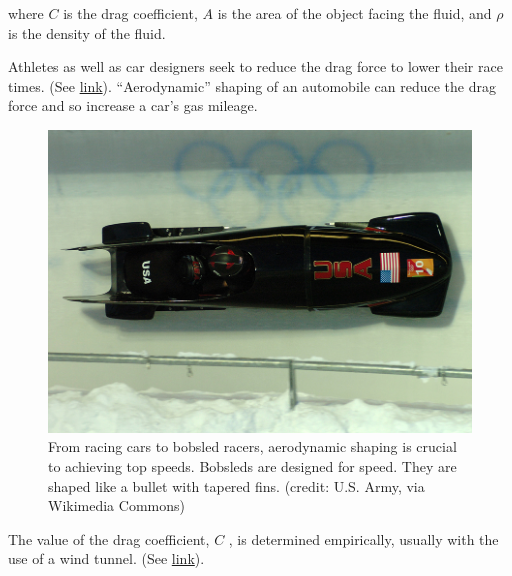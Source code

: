\documentclass[
]{book}
\begin{document}
where \(C{}\) is the drag coefficient, \(A{}\) is the area of the object
facing the fluid, and \(\rho{}\) is the density of the fluid.

Athletes as well as car designers seek to reduce the drag force to lower
their race times. (See
\protect\hyperlink{import-auto-id1165298931800}{link}).
``Aerodynamic'' shaping of an automobile can reduce the drag force and so
increase a car's gas mileage.

\begin{figure}
\hypertarget{import-auto-id1165298931800}{%
\centering
\includegraphics{images/Figure_06_02_02a.jpg}
\caption{From racing cars to bobsled racers, aerodynamic shaping is crucial to
achieving top speeds. Bobsleds are designed for speed. They are shaped
like a bullet with tapered fins. (credit: U.S. Army, via Wikimedia
Commons)}\label{import-auto-id1165298931800}
}
\end{figure}

The value of the drag coefficient, \(C{}\) , is determined empirically,
usually with the use of a wind tunnel. (See
\protect\hyperlink{import-auto-id1165298787035}{link}).
\end{document}
